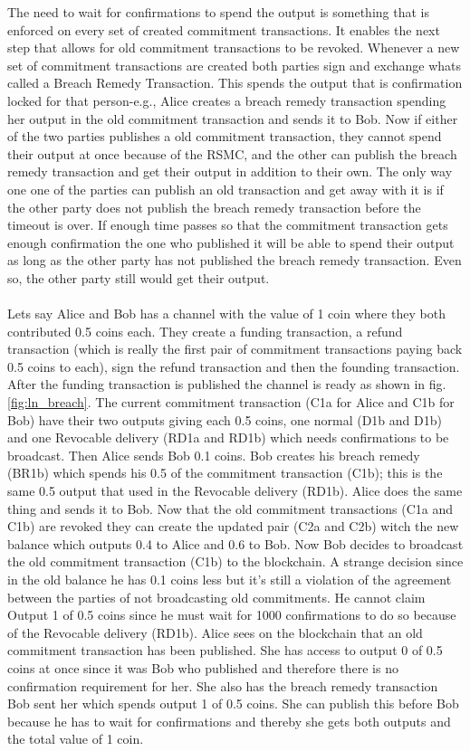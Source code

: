 The need to wait for confirmations to spend the output is something that is enforced on every set of created commitment transactions. It enables the next step that allows for old commitment transactions to be revoked. Whenever a new set of commitment transactions are created both parties sign and exchange whats called a Breach Remedy Transaction. This spends the output that is confirmation locked for that person-e.g., Alice creates a breach remedy transaction spending her output in the old commitment transaction and sends it to Bob. Now if either of the two parties publishes a old commitment transaction, they cannot spend their output at once because of the RSMC, and the other can publish the breach remedy transaction and get their output in addition to their own. The only way one one of the parties can publish an old transaction and get away with it is if the other party does not publish the breach remedy transaction before the timeout is over. If enough time passes so that the commitment transaction gets enough confirmation the one who published it will be able to spend their output as long as the other party has not published the breach remedy transaction. Even so, the other party still would get their output.

\paragraph{}
Lets say Alice and Bob has a channel with the value of 1 coin where they both contributed 0.5 coins each. They create a funding transaction, a refund transaction (which is really the first pair of commitment transactions paying back 0.5 coins to each), sign the refund transaction and then the founding transaction. After the funding transaction is published the channel is ready as shown in fig.\ref{fig:ln_breach}. The current commitment transaction (C1a for Alice and C1b for Bob) have their two outputs giving each 0.5 coins, one normal (D1b and D1b) and one Revocable delivery (RD1a and RD1b) which needs confirmations to be broadcast. Then Alice sends Bob 0.1 coins. Bob creates his breach remedy (BR1b) which spends his 0.5 of the commitment transaction (C1b); this is the same 0.5 output that used in the Revocable delivery (RD1b).
Alice does the same thing and sends it to Bob. Now that the old commitment transactions (C1a and C1b) are revoked they can create the updated pair (C2a and C2b) witch the new balance which outputs 0.4 to Alice and 0.6 to Bob. Now Bob decides to broadcast the old commitment transaction (C1b) to the blockchain. A strange decision since in the old balance he has 0.1 coins less but it's still a violation of the agreement between the parties of not broadcasting old commitments. 
He cannot claim Output 1 of 0.5 coins since he must wait for 1000 confirmations to do so because of the Revocable delivery (RD1b).
Alice sees on the blockchain that an old commitment transaction has been published. She has access to output 0 of 0.5 coins at once since it was Bob who published and therefore there is no confirmation requirement for her. She also has the breach remedy transaction Bob sent her which spends output 1 of 0.5 coins. She can publish this before Bob because he has to wait for confirmations and thereby she gets both outputs and the total value of 1 coin.

